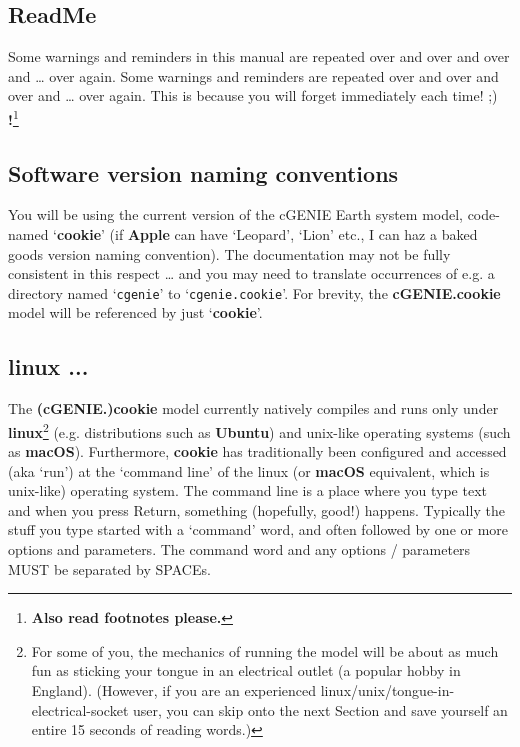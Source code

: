 \subsection*{ReadMe}

Some warnings and reminders in this manual are repeated over and over and over and … over again.
Some warnings and reminders are repeated over and over and over and … over again.
This is because you will forget immediately each time! ;)
\\\textbf{!}\footnote{\textbf{Also read footnotes please.}}


\subsection*{Software version naming conventions}

You will be using the current version of the cGENIE Earth system model, code-named ‘\textbf{cookie}’ (if \textbf{Apple} can have ‘Leopard’, ‘Lion’ etc., I can haz a baked goods version naming convention). The documentation may not be fully consistent in this respect … and you may need to translate occurrences of e.g. a directory named ‘\texttt{cgenie}’ to ‘\texttt{cgenie.cookie}’. For brevity, the \textbf{cGENIE.cookie} model will be referenced by just ‘\textbf{cookie}’.


\subsection*{linux ...}

The \textbf{(cGENIE.)cookie} model currently natively compiles and runs only under \textbf{linux}\footnote{For some of you, the mechanics of running the model will be about as much fun as sticking your tongue in an electrical outlet (a popular hobby in England). (However, if you are an experienced linux/unix/tongue-in-electrical-socket user, you can skip onto the next Section and save yourself an entire 15 seconds of reading words.)} (e.g. distributions such as \textbf{Ubuntu}) and unix-like operating systems (such as \textbf{macOS}). Furthermore, \textbf{cookie} has traditionally been configured and accessed (aka ‘run') at the ‘command line’ of the linux (or \textbf{macOS} equivalent, which is unix-like) operating system. The command line is a place where you type text and when you press \small\textsf{Return}\normalsize, something (hopefully, good!) happens. Typically the stuff you type started with a ‘command’ word, and often followed by one or more options and parameters. The command word and any options / parameters MUST be separated by SPACEs.

